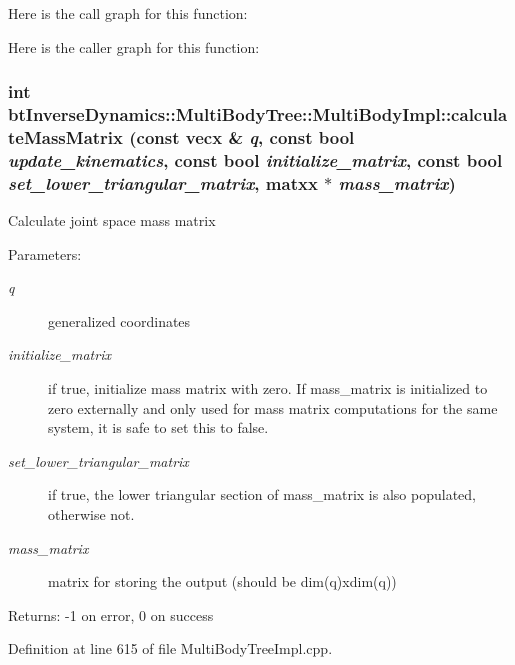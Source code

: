 Here is the call graph for this function:

Here is the caller graph for this function:\hypertarget{classbt_inverse_dynamics_1_1_multi_body_tree_1_1_multi_body_impl_6e4b376b92377b3350d4ebfd94652a0f}{
\subsubsection[calculateMassMatrix]{\setlength{\rightskip}{0pt plus 5cm}int btInverseDynamics::MultiBodyTree::MultiBodyImpl::calculateMassMatrix (const vecx \& {\em q}, \/  const bool {\em update\_\-kinematics}, \/  const bool {\em initialize\_\-matrix}, \/  const bool {\em set\_\-lower\_\-triangular\_\-matrix}, \/  matxx $\ast$ {\em mass\_\-matrix})}}
\label{classbt_inverse_dynamics_1_1_multi_body_tree_1_1_multi_body_impl_6e4b376b92377b3350d4ebfd94652a0f}


Calculate joint space mass matrix \begin{Desc}
\item[Parameters:]
\begin{description}
\item[{\em q}]generalized coordinates \item[{\em initialize\_\-matrix}]if true, initialize mass matrix with zero. If mass\_\-matrix is initialized to zero externally and only used for mass matrix computations for the same system, it is safe to set this to false. \item[{\em set\_\-lower\_\-triangular\_\-matrix}]if true, the lower triangular section of mass\_\-matrix is also populated, otherwise not. \item[{\em mass\_\-matrix}]matrix for storing the output (should be dim(q)xdim(q)) \end{description}
\end{Desc}
\begin{Desc}
\item[Returns:]-1 on error, 0 on success \end{Desc}
 

Definition at line 615 of file MultiBodyTreeImpl.cpp.

